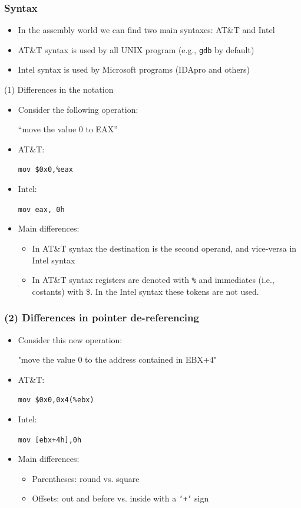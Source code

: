 \documentclass[]{beamer}
\begin{document}
\begin{frame}
  \frametitle{Syntax}
  \begin{itemize}
  \item{In the assembly world we can find two main syntaxes: AT\&T and Intel}
  \item{AT\&T syntax is used by all UNIX program (e.g., \texttt{gdb} by default)}
  \item{Intel syntax is used by Microsoft programs (IDApro and others)}
  \end{itemize}
\end{frame}

\begin{frame}{(1) Differences in the notation}
  \begin{itemize}
  \item{Consider the following operation:\newline
      \centerline{``move the value 0 to EAX''}}
  \item{AT\&T: \centerline{\texttt{mov \$0x0,\%eax}} }
  \item{Intel: \centerline{\texttt{mov eax, 0h}}}
    \item{Main differences:}
      \begin{itemize}
      \item{In AT\&T syntax the destination is the second operand, and vice-versa in Intel syntax}
      \item{In AT\&T syntax registers are denoted with \texttt{\%} and immediates (i.e., costants) with \$. In the Intel syntax these tokens are not used. }
      \end{itemize}
    \end{itemize}
  \end{frame}

\begin{frame}
  \frametitle{(2) Differences in pointer de-referencing}
  \begin{itemize}
  \item{Consider this new operation:\newline\centerline {"move the value 0 to the address contained in EBX+4"}}
  \item{AT\&T: \centerline{ \texttt{mov \$0x0,0x4(\%ebx)}}}
  \item{Intel: \centerline{ \texttt{mov [ebx+4h],0h} }}
  \item{Main differences:}
    \begin{itemize}
    \item{Parentheses: round vs. square}
    \item{Offsets: out and before vs. inside with a \texttt{`+'} sign}
    \end{itemize}
  \end{itemize}
\end{frame}
\end{document}
